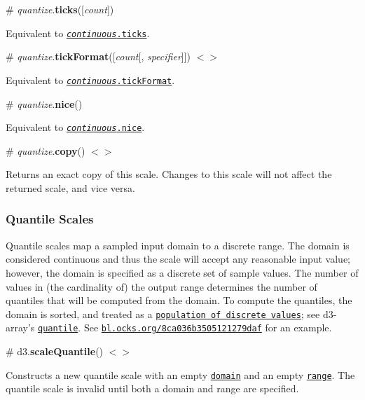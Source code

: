 \label{_quantize_ticks}%
\# {\itshape quantize}.{\bfseries ticks}(\mbox{[}{\itshape count}\mbox{]})

Equivalent to \href{#continuous_ticks}{\tt {\itshape continuous}.ticks}.

\label{_quantize_tickFormat}%
\# {\itshape quantize}.{\bfseries tick\+Format}(\mbox{[}{\itshape count}\mbox{[}, {\itshape specifier}\mbox{]}\mbox{]}) \href{https://github.com/d3/d3-scale/blob/master/src/linear.js#L14}{\tt $<$$>$}

Equivalent to \href{#continuous_tickFormat}{\tt {\itshape continuous}.tick\+Format}.

\label{_quantize_nice}%
\# {\itshape quantize}.{\bfseries nice}()

Equivalent to \href{#continuous_nice}{\tt {\itshape continuous}.nice}.

\label{_quantize_copy}%
\# {\itshape quantize}.{\bfseries copy}() \href{https://github.com/d3/d3-scale/blob/master/src/quantize.js#L39}{\tt $<$$>$}

Returns an exact copy of this scale. Changes to this scale will not affect the returned scale, and vice versa.

\subsubsection*{Quantile Scales}

Quantile scales map a sampled input domain to a discrete range. The domain is considered continuous and thus the scale will accept any reasonable input value; however, the domain is specified as a discrete set of sample values. The number of values in (the cardinality of) the output range determines the number of quantiles that will be computed from the domain. To compute the quantiles, the domain is sorted, and treated as a \href{https://en.wikipedia.org/wiki/Quantile#Quantiles_of_a_population}{\tt population of discrete values}; see d3-\/array’s \href{https://github.com/d3/d3-array#quantile}{\tt quantile}. See \href{http://bl.ocks.org/mbostock/8ca036b3505121279daf}{\tt bl.\+ocks.\+org/8ca036b3505121279daf} for an example.

\label{_scaleQuantile}%
\# d3.{\bfseries scale\+Quantile}() \href{https://github.com/d3/d3-scale/blob/master/src/quantile.js}{\tt $<$$>$}

Constructs a new quantile scale with an empty \href{#quantile_domain}{\tt domain} and an empty \href{#quantile_range}{\tt range}. The quantile scale is invalid until both a domain and range are specified.

